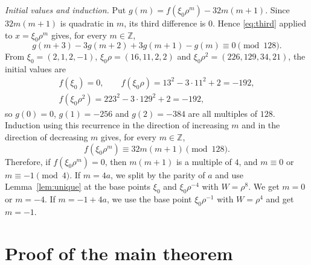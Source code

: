 \documentclass[a4paper,11pt]{article}
\theoremstyle{plain}
\theoremstyle{definition}
\theoremstyle{remark}
\numberwithin{equation}{section}
\numberwithin{table}{section}
\newcommand{\Z}{\mathbb{Z}}
\begin{document}
\emph{Initial values and induction.} Put $g(m)=f(\xi_0\rho^m)-32m(m+1)$. Since $32m(m+1)$ is quadratic in $m$, its third difference is $0$. Hence \eqref{eq:third} applied to $x=\xi_0\rho^m$ gives, for every $m\in\Z$,
\[
g(m+3)-3g(m+2)+3g(m+1)-g(m)\equiv0\pmod{128}.
\]
From $\xi_0=(2,1,2,-1)$, $\xi_0\rho=(16,11,2,2)$ and $\xi_0\rho^2=(226,129,34,21)$, the initial values are
\begin{gather*}
f(\xi_0)=0,\qquad f(\xi_0\rho)=13^2-3\cdot11^2+2=-192,\\
f(\xi_0\rho^2)=223^2-3\cdot129^2+2=-192,
\end{gather*}
so $g(0)=0$, $g(1)=-256$ and $g(2)=-384$ are all multiples of $128$.
Induction using this recurrence in the direction of increasing $m$ and in the direction of decreasing $m$ gives, for every $m\in\Z$,
\begin{equation}\label{eq:entrance}
f(\xi_0\rho^m)\equiv32m(m+1)\pmod{128}.
\end{equation}
Therefore, if $f(\xi_0\rho^m)=0$, then $m(m+1)$ is a multiple of $4$, and $m\equiv0$ or $m\equiv-1\pmod4$.
If $m=4a$, we split by the parity of $a$ and use Lemma~\ref{lem:unique} at the base points $\xi_0$ and $\xi_0\rho^{-4}$ with $W=\rho^8$. We get $m=0$ or $m=-4$.
If $m=-1+4a$, we use the base point $\xi_0\rho^{-1}$ with $W=\rho^4$ and get $m=-1$.

\section{Proof of the main theorem}\label{sec:conclusion}
\end{document}
